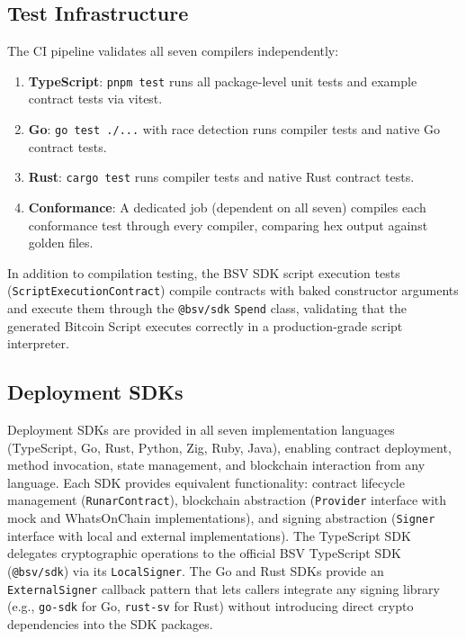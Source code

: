 \documentclass[11pt,a4paper]{article}
\begin{document}
\subsection{Test Infrastructure}
\label{sec:eval-infra}

The CI pipeline validates all seven compilers independently:

\begin{enumerate}[nosep]
  \item \textbf{TypeScript}: \texttt{pnpm test} runs all package-level
    unit tests and example contract tests via vitest.
  \item \textbf{Go}: \texttt{go test ./...} with race detection runs
    compiler tests and native Go contract tests.
  \item \textbf{Rust}: \texttt{cargo test} runs compiler tests and
    native Rust contract tests.
  \item \textbf{Conformance}: A dedicated job (dependent on all seven)
    compiles each conformance test through every compiler, comparing hex
    output against golden files.
\end{enumerate}

In addition to compilation testing, the BSV SDK script execution tests
(\texttt{ScriptExecutionContract}) compile contracts with baked constructor
arguments and execute them through the \texttt{@bsv/sdk} \texttt{Spend}
class, validating that the generated Bitcoin Script executes correctly in
a production-grade script interpreter.

\subsection{Deployment SDKs}
\label{sec:eval-sdk}

Deployment SDKs are provided in all seven implementation languages
(TypeScript, Go, Rust, Python, Zig, Ruby, Java), enabling contract deployment, method invocation,
state management, and blockchain interaction from any language. Each SDK
provides equivalent functionality: contract lifecycle management
(\texttt{RunarContract}), blockchain abstraction (\texttt{Provider}
interface with mock and WhatsOnChain implementations), and signing
abstraction (\texttt{Signer} interface with local and external
implementations). The TypeScript SDK delegates cryptographic operations
to the official BSV TypeScript SDK (\texttt{@bsv/sdk}) via its
\texttt{LocalSigner}. The Go and Rust SDKs provide an
\texttt{ExternalSigner} callback pattern that lets callers integrate
any signing library (e.g., \texttt{go-sdk} for Go, \texttt{rust-sv}
for Rust) without introducing direct crypto dependencies into the SDK
packages.
\end{document}
